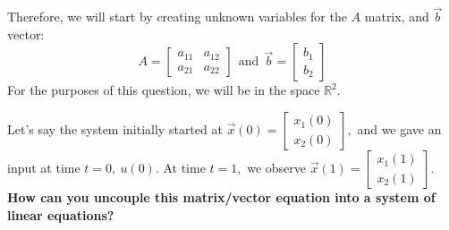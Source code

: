 Therefore, we will start by creating unknown variables for the $A$ matrix, and $\vec{b}$ vector:
\begin{equation}
A = \begin{bmatrix} a_{11} & a_{12} \\ a_{21} & a_{22} \end{bmatrix} \ \ \text{and} \ \ \vec{b} = \begin{bmatrix} b_{1} \\ b_{2} \end{bmatrix}
\end{equation}
For the purposes of this question, we will be in the space $\mathbb{R}^2.$

\clearpage

\begin{enumerate}
  \qitem Let's say the system initially started at $\vec{x}(0) = \begin{bmatrix} x_{1}(0) \\ x_{2}(0) \end{bmatrix},$ and we gave an input at time $t = 0, \ u(0).$
  At time $t = 1,$ we observe $\vec{x}(1) = \begin{bmatrix} x_{1}(1) \\ x_{2}(1) \end{bmatrix}.$
  \textbf{How can you uncouple this matrix/vector equation into a system of linear equations?}

  \ws{\vspace{100px}}



\end{enumerate}
